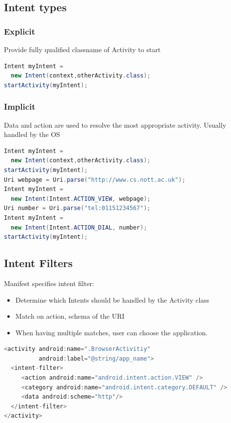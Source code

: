 \documentclass{article}
\begin{document}
\subsection{Intent types}

\begin{multicols}{2}

\subsubsection{Explicit}
Provide fully qualified classname of Activity to start
\begin{lstlisting}[language=Java, basicstyle=\small]
Intent myIntent =
  new Intent(context,otherActivity.class);
startActivity(myIntent);
\end{lstlisting}

\vfill\null
\columnbreak

\subsubsection{Implicit}
Data and action are used to resolve the most appropriate activity. Usually handled by the OS
\begin{lstlisting}[language=Java,basicstyle=\small]
Intent myIntent =
  new Intent(context,otherActivity.class);
startActivity(myIntent);
Uri webpage = Uri.parse("http://www.cs.nott.ac.uk");
Intent myIntent =
  new Intent(Intent.ACTION_VIEW, webpage);
Uri number = Uri.parse("tel:01151234567");
Intent myIntent =
  new Intent(Intent.ACTION_DIAL, number);
startActivity(myIntent);
\end{lstlisting}
\end{multicols}

\subsection{Intent Filters}

Manifest specifies intent filter:
\begin{itemize}
  \item Determine which Intents should be handled by the Activity class
  \item Match on action, schema of the URI
  \item When having multiple matches, user can choose the application.
\end{itemize}

\begin{lstlisting}[language=Java]
<activity android:name=".BrowserActivitiy"
          android:label="@string/app_name">
  <intent-filter>
     <action android:name="android.intent.action.VIEW" />
     <category android:name="android.intent.category.DEFAULT" />
     <data android:scheme="http"/>
  </intent-filter>
</activity>
\end{lstlisting}
\end{document}
